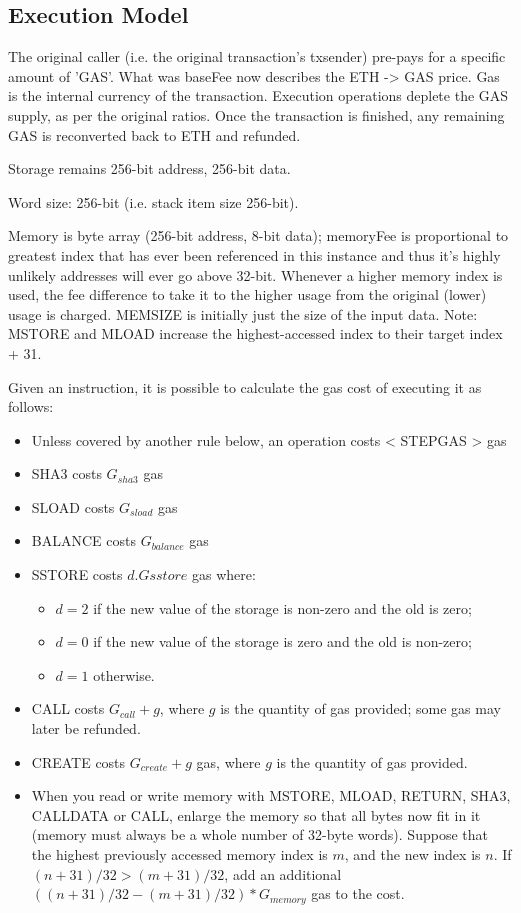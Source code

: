 \documentclass[9pt,oneside]{amsart}
\begin{document}
\begin{multicols}{2}
\subsection{Execution Model} \label{ch:model}


The original caller (i.e. the original transaction's txsender) pre-pays for a specific amount of 'GAS'. What was baseFee now describes the ETH -> GAS price. Gas is the internal currency of the transaction. Execution operations deplete the GAS supply, as per the original ratios. Once the transaction is finished, any remaining GAS is reconverted back to ETH and refunded.

Storage remains 256-bit address, 256-bit data.

Word size: 256-bit (i.e. stack item size 256-bit).

Memory is byte array (256-bit address, 8-bit data); memoryFee is proportional to greatest index that has ever been referenced in this instance and thus it's highly unlikely addresses will ever go above 32-bit. Whenever a higher memory index is used, the fee difference to take it to the higher usage from the original (lower) usage is charged. MEMSIZE is initially just the size of the input data. Note: MSTORE and MLOAD increase the highest-accessed index to their target index + 31.


Given an instruction, it is possible to calculate the gas cost of executing it as follows:

\begin{itemize}
\item Unless covered by another rule below, an operation costs < STEPGAS > gas
\item SHA3 costs $G_{sha3}$ gas
\item SLOAD costs $G_{sload}$ gas
\item BALANCE costs $G_{balance}$ gas
\item SSTORE costs $d.G{sstore}$ gas where:
\begin{itemize}
\item $d = 2$ if the new value of the storage is non-zero and the old is zero;
\item $d = 0$ if the new value of the storage is zero and the old is non-zero;
\item $d = 1$ otherwise.
\end{itemize}
\item CALL costs $G_{call} + g$, where $g$ is the quantity of gas provided; some gas may later be refunded.
\item CREATE costs $G_{create} + g$ gas, where $g$ is the quantity of gas provided.
\item When you read or write memory with MSTORE, MLOAD, RETURN, SHA3, CALLDATA or CALL, enlarge the memory so that all bytes now fit in it (memory must always be a whole number of 32-byte words). Suppose that the highest previously accessed memory index is $m$, and the new index is $n$. If $(n + 31) / 32 > (m + 31) / 32$, add an additional $((n + 31) / 32 - (m + 31) / 32) * G_{memory}$ gas to the cost.
\end{itemize}


\end{multicols}
\end{document}
